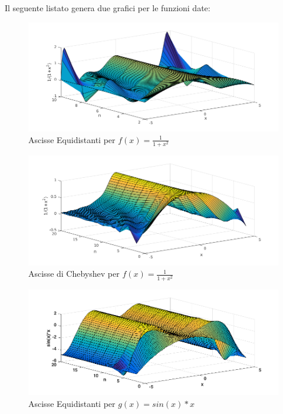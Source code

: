 Il seguente listato genera due grafici per le funzioni date:



\begin{figure}
\includegraphics[scale=0.7]{cap_4/es2/Runge_equi.png}
\caption{Ascisse Equidistanti per $f(x) = \frac{1}{1+x^2}$}
\label{RungeEq}
\end{figure}
\begin{figure}
\includegraphics[scale=0.7]{cap_4/es2/Runge_cheb.png}
\caption{Ascisse di Chebyshev per $f(x) = \frac{1}{1+x^2}$}
\label{RungeChe}
\end{figure}
\begin{figure}
\includegraphics[scale=0.7]{cap_4/es2/Sin_equi.png}
\caption{Ascisse Equidistanti per $g(x) = sin(x)*x$}
\label{SinEq}
\end{figure}
